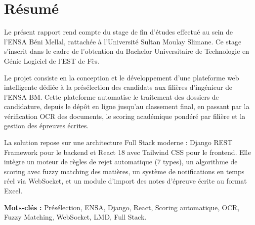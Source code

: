 \chapter*{Résumé}

Le présent rapport rend compte du stage de fin d'études effectué au sein de l'ENSA Béni Mellal, rattachée à l'Université Sultan Moulay Slimane. Ce stage s'inscrit dans le cadre de l'obtention du Bachelor Universitaire de Technologie en Génie Logiciel de l'EST de Fès.

Le projet consiste en la conception et le développement d'une plateforme web intelligente dédiée à la présélection des candidats aux filières d'ingénieur de l'ENSA BM. Cette plateforme automatise le traitement des dossiers de candidature, depuis le dépôt en ligne jusqu'au classement final, en passant par la vérification OCR des documents, le scoring académique pondéré par filière et la gestion des épreuves écrites.

La solution repose sur une architecture Full Stack moderne : Django REST Framework pour le backend et React 18 avec Tailwind CSS pour le frontend. Elle intègre un moteur de règles de rejet automatique (7 types), un algorithme de scoring avec fuzzy matching des matières, un système de notifications en temps réel via WebSocket, et un module d'import des notes d'épreuve écrite au format Excel.

\textbf{Mots-clés :} Présélection, ENSA, Django, React, Scoring automatique, OCR, Fuzzy Matching, WebSocket, LMD, Full Stack.
